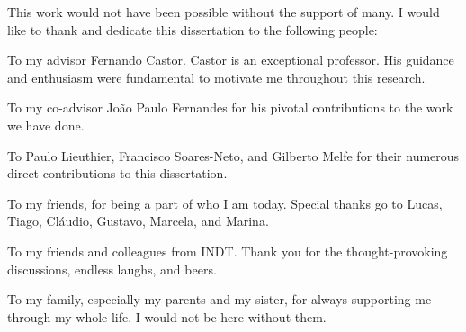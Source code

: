 This work would not have been possible without the support of many. I would like to thank and dedicate this dissertation to the following people:

To my advisor Fernando Castor. Castor is an exceptional professor. His guidance and enthusiasm were fundamental to motivate me throughout this research.

To my co-advisor João Paulo Fernandes for his pivotal contributions to the work we have done.

To Paulo Lieuthier, Francisco Soares-Neto, and Gilberto Melfe for their numerous direct contributions to this dissertation.

To my friends, for being a part of who I am today. Special thanks go to Lucas, Tiago, Cláudio, Gustavo, Marcela, and Marina.

To my friends and colleagues from INDT. Thank you for the thought-provoking discussions, endless laughs, and beers.

To my family, especially my parents and my sister, for always supporting me through my whole life. I would not be here without them.
